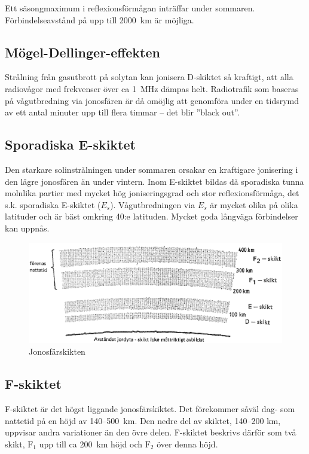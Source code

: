 Ett säsongmaximum i reflexionsförmågan inträffar under
sommaren. Förbindelseavstånd på upp till 2000~km är möjliga.

\subsection{Mögel-Dellinger-effekten}

Strålning från gasutbrott på solytan kan jonisera D-skiktet så
kraftigt, att alla radiovågor med frekvenser över ca 1~MHz dämpas
helt.  Radiotrafik som baseras på vågutbredning via jonosfären är då
omöjlig att genomföra under en tidsrymd av ett antal minuter upp till
flera timmar -- det blir ''black out''.

\subsection{Sporadiska E-skiktet}

Den starkare solinstrålningen under sommaren orsakar en kraftigare
jonisering i den lägre jonosfären än under vintern. Inom E-skiktet
bildas då sporadiska tunna molnlika partier med mycket hög
joniseringsgrad och stor reflexionsförmåga, det s.k. sporadiska
E-skiktet (\(E_s\)). Vågutbredningen via \(E_s\) är mycket olika på
olika latituder och är bäst omkring 40:e latituden. Mycket goda långväga
förbindelser kan uppnås.

\begin{figure}
  \includegraphics[width=\textwidth]{images/cropped_pdfs/bild_2_7-07.pdf}
  \caption{Jonosfärskikten}
  \label{fig:bildII7-7}
\end{figure}

\subsection{F-skiktet}

F-skiktet är det högst liggande jonosfärskiktet. Det förekommer såväl
dag- som nattetid på en höjd av 140--500~km. Den nedre del av skiktet,
140--200 km, uppvisar andra variationer än den övre delen. F-skiktet
beskrivs därför som två skikt, \(\mathrm{F_1}\) upp till ca 200~km
höjd och \(\mathrm{F_2}\) över denna höjd.

